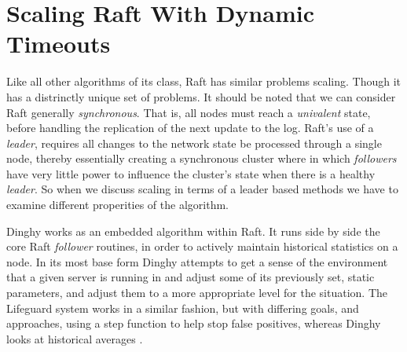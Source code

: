 \section{Scaling Raft With Dynamic Timeouts}

Like all other algorithms of its class, Raft has similar problems scaling. Though it has a distrinctly unique set of problems. It should be noted that we can consider Raft generally \textit{synchronous}. That is, all nodes must reach a \textit{univalent} state, before handling the replication of the next update to the log. Raft's use of a \textit{leader}, requires all changes to the network state be processed through a single node, thereby essentially creating a synchronous cluster where in which \textit{followers} have very little power to influence the cluster's state when there is a healthy \textit{leader}. So when we discuss scaling in terms of a leader based methods we have to examine different properities of the algorithm.

Dinghy works as an embedded algorithm within Raft. It runs side by side the core Raft \textit{follower} routines, in order to actively maintain historical statistics on a node. In its most base form Dinghy attempts to get a sense of the environment that a given server is running in and adjust some of its previously set, static parameters, and adjust them to a more appropriate level for the situation. The Lifeguard system works in a similar fashion, but with differing goals, and approaches, using a step function to help stop false positives, whereas Dinghy looks at historical averages \cite{Lifeguard}.